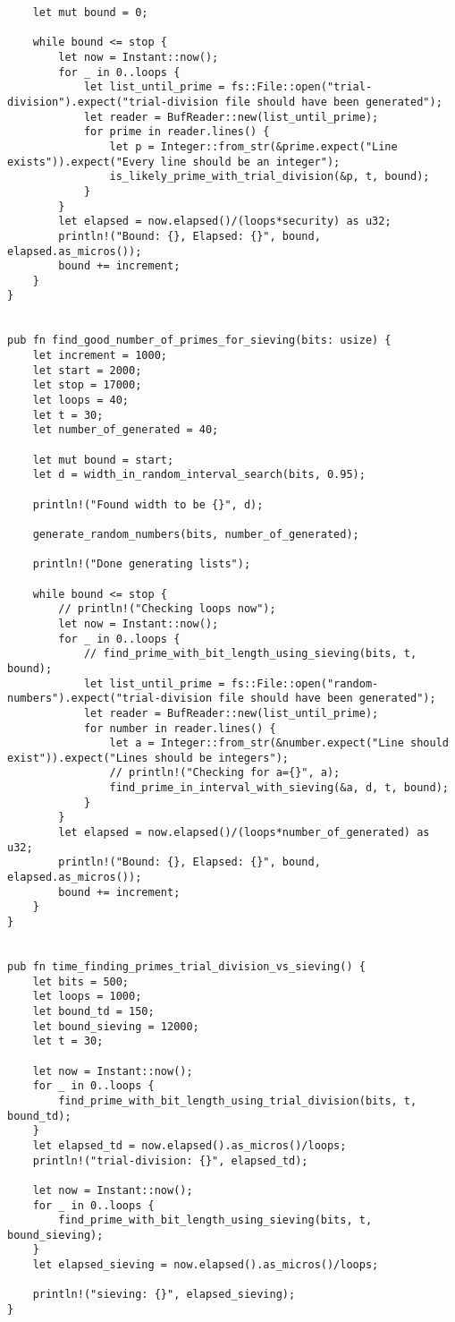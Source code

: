 \begin{verbatim}
    let mut bound = 0;

    while bound <= stop {
        let now = Instant::now();
        for _ in 0..loops {
            let list_until_prime = fs::File::open("trial-division").expect("trial-division file should have been generated");
            let reader = BufReader::new(list_until_prime);
            for prime in reader.lines() {
                let p = Integer::from_str(&prime.expect("Line exists")).expect("Every line should be an integer");
                is_likely_prime_with_trial_division(&p, t, bound);
            }
        }
        let elapsed = now.elapsed()/(loops*security) as u32;
        println!("Bound: {}, Elapsed: {}", bound, elapsed.as_micros());
        bound += increment;
    }
}


pub fn find_good_number_of_primes_for_sieving(bits: usize) {
    let increment = 1000;
    let start = 2000;
    let stop = 17000;
    let loops = 40;
    let t = 30;
    let number_of_generated = 40;

    let mut bound = start;
    let d = width_in_random_interval_search(bits, 0.95);

    println!("Found width to be {}", d);

    generate_random_numbers(bits, number_of_generated);

    println!("Done generating lists");

    while bound <= stop {
        // println!("Checking loops now");
        let now = Instant::now();
        for _ in 0..loops {
            // find_prime_with_bit_length_using_sieving(bits, t, bound);
            let list_until_prime = fs::File::open("random-numbers").expect("trial-division file should have been generated");
            let reader = BufReader::new(list_until_prime);
            for number in reader.lines() {
                let a = Integer::from_str(&number.expect("Line should exist")).expect("Lines should be integers");
                // println!("Checking for a={}", a);
                find_prime_in_interval_with_sieving(&a, d, t, bound);
            }
        }
        let elapsed = now.elapsed()/(loops*number_of_generated) as u32;
        println!("Bound: {}, Elapsed: {}", bound, elapsed.as_micros());
        bound += increment;
    }
}


pub fn time_finding_primes_trial_division_vs_sieving() {
    let bits = 500;
    let loops = 1000;
    let bound_td = 150;
    let bound_sieving = 12000;
    let t = 30;

    let now = Instant::now();
    for _ in 0..loops {
        find_prime_with_bit_length_using_trial_division(bits, t, bound_td);
    }
    let elapsed_td = now.elapsed().as_micros()/loops;
    println!("trial-division: {}", elapsed_td);

    let now = Instant::now();
    for _ in 0..loops {
        find_prime_with_bit_length_using_sieving(bits, t, bound_sieving);
    }
    let elapsed_sieving = now.elapsed().as_micros()/loops;

    println!("sieving: {}", elapsed_sieving);
}
\end{verbatim}



